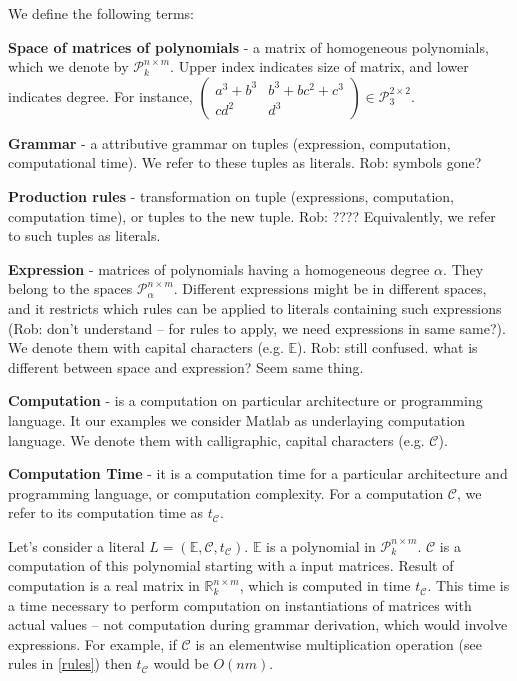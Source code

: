We define the following terms: %


{\bf Space of matrices of polynomials} - a matrix of homogeneous polynomials, which we denote by $\mathcal{P}^{n \times m}_k$. Upper index indicates size of matrix, and lower indicates degree. For instance, $\begin{pmatrix} a^3 + b^3 & b^3 + bc^2 + c^3\\ cd^2 & d^3 \end{pmatrix} \in \mathcal{P}^{2 \times 2}_3$. 

{\bf Grammar} - a attributive grammar on tuples (expression, computation, computational time). We refer to these tuples as literals. Rob: symbols gone?


{\bf Production rules} - transformation on tuple (expressions, computation, computation time), or tuples to the new tuple. Rob: ???? Equivalently, we refer to such tuples as literals. 


{\bf Expression} - matrices of polynomials having a homogeneous degree $\alpha$. They belong to the spaces $\mathcal{P}^{n \times m}_\alpha$. Different expressions might be in different spaces, and it restricts which rules can be applied to literals containing such expressions (Rob: don't understand -- for rules to apply, we need expressions in same same?). We denote them with capital characters (e.g. $\mathbb{E}$). Rob: still confused. what is different between space and expression? Seem same thing.


{\bf Computation} - is a computation on particular architecture or programming language. It our examples we consider Matlab as underlaying computation language. We denote them with calligraphic, capital characters (e.g. $\mathcal{C}$).


{\bf Computation Time} - it is a computation time for a particular architecture and programming language, or computation complexity. For a computation $\mathcal{C}$, we refer to its computation time as $t_{\mathcal{C}}$. 


Let's consider a literal $L = (\mathbb{E}, \mathcal{C}, t_\mathcal{C})$. $\mathbb{E}$ is a polynomial in $\mathcal{P}^{n \times m}_k$. $\mathcal{C}$ is a computation of this polynomial starting with a input matrices. Result of computation is a real matrix
in $\mathbb{R}^{n \times m}_k$, which is computed in time $t_\mathcal{C}$. This time is a time necessary to perform computation on instantiations of matrices with actual values -- not computation during grammar derivation, which would involve expressions. For example, if $\mathcal{C}$ is an elementwise multiplication operation (see rules in \ref{rules}) then $t_\mathcal{C}$ would be $O(nm)$.

